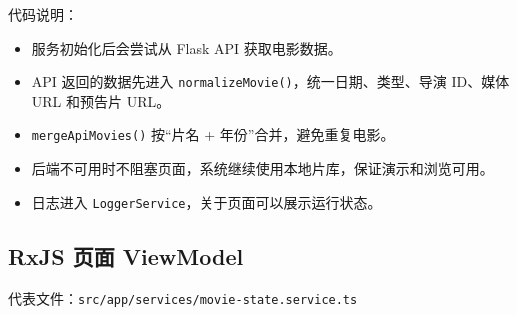 \documentclass[
]{ctexart}
\providecommand{\tightlist}{%
  \setlength{\itemsep}{0pt}\setlength{\parskip}{0pt}}
\begin{document}
代码说明：

\begin{itemize}
\tightlist
\item
  服务初始化后会尝试从 Flask API 获取电影数据。
\item
  API 返回的数据先进入 \texttt{normalizeMovie()}，统一日期、类型、导演
  ID、媒体 URL 和预告片 URL。
\item
  \texttt{mergeApiMovies()} 按``片名 + 年份''合并，避免重复电影。
\item
  后端不可用时不阻塞页面，系统继续使用本地片库，保证演示和浏览可用。
\item
  日志进入 \texttt{LoggerService}，关于页面可以展示运行状态。
\end{itemize}

\hypertarget{rxjs-ux9875ux9762-viewmodel}{%
\subsection{RxJS 页面 ViewModel}\label{rxjs-ux9875ux9762-viewmodel}}

代表文件：\texttt{src/app/services/movie-state.service.ts}
\end{document}

